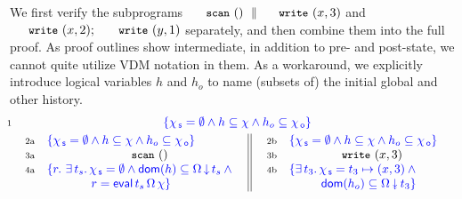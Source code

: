 \documentclass[a4paper,UKenglish]{lipics-v2016}
\newcommand{\dom}[1]{\mathsf{dom}(#1)}
\newcommand{\specK}[1]{\ensuremath{\textcolor{blue}{#1}}}
\newcommand{\esc}[1]{\text{\texttt{\small{#1}}}}
\newcommand{\selfsub}{\mathsf{s}}
\newcommand{\othersub}{\mathsf{o}}
\newcommand{\hist}{\chi}
\newcommand{\histS}{\hist_{\, \selfsub}}
\newcommand{\histO}{\hist_{\, \othersub}}
\newcommand{\hempty}{\emptyset}
\newcommand{\hpts}{\mapsto}
\newcommand{\ldot}{\mathord{.}\,}
\newcommand{\stableorder}{\Omega}
\newcommand{\num}[1]{{\text{{\scriptsize{#1}}}}}
\theoremstyle{definition}
\begin{document}
We first verify the subprograms $\esc{scan}~()~\parallel
\esc{write}~(x,3)$ and $\esc{write}~(x,2);\ \esc{write}~(y,1)$
separately, and then combine them into the full proof. As proof
outlines show intermediate, in addition to pre- and post-state, we
cannot quite utilize VDM notation in them. As a workaround, we
explicitly introduce logical variables $h$ and $h_o$ to name (subsets
of) the initial global and other history.
%
%
{
\[
\!\!\!\!\!\begin{array}{l c} \num{1} &
 {\specK{\{ \histS = \hempty \wedge h \subseteq \hist \wedge h_o
                           \subseteq \histO \}}} \\[3pt]
& \!\!\!\!\!\! \begin{tabular}{l || l}
     \begin{array}[t]{l l}
       \num{2a} &
       \specK{\{ \histS = \hempty \wedge h \subseteq \hist \wedge h_o \subseteq \histO \}}\\
       \num{3a} & \multicolumn{1}{c}{\esc{scan}~()} \\
       \num{4a} &
       \specK{\{ r\ldot\, \exists\, t_s\ldot
         \histS = \hempty \wedge  \dom{h} \subseteq \ideal{\stableorder}{t_s} \wedge \hbox{}}\\
       &
       \specK{\phantom{\{r\ldot\, \exists\, t_s\ldot}\,
         r = \eval\, t_s\, \stableorder\, \hist\}}
     \end{array}~&~
     \!\!\!\begin{array}[t]{r l}
       \num{2b} &
       \specK{\{ \histS = \hempty \wedge h \subseteq \hist \wedge h_o \subseteq \histO \}} \\       
       \num{3b} & \multicolumn{1}{c}{\esc{write}~(x,3)}\\
       \num{4b} &
       \specK{\{ \exists\, t_3\ldot
         \histS = t_3 \hpts (x,3) \wedge \hbox{}}\\
       & \specK{\phantom{\{\exists\, t_3\ldot}\,
         \dom{h_o} \subseteq \sideal{\stableorder}{t_3}\}}
     \end{array}
   \end{tabular}\\[3pt]

\end{array}\]}
\end{document}
